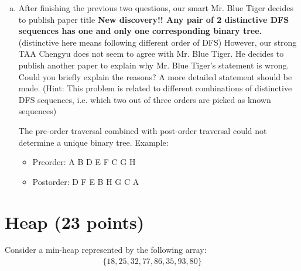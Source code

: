 \documentclass[11pt]{exam}
\begin{document}
\begin{enumerate}[a)]
\begin{solution}
    \par 
    \begin{center}
    \end{center}
\end{solution}

\item After finishing the previous two questions, our smart Mr. Blue Tiger decides to publish paper title \textbf {New discovery!! Any pair of 2 distinctive DFS sequences has one and only one corresponding binary tree.} (distinctive here means following different order of DFS)
However, our strong TAA Chengyu does not seem to agree with Mr. Blue Tiger. He decides to publish another paper to explain why Mr. Blue Tiger's statement is wrong. Could you briefly explain the reasons? A more detailed statement should be made. (Hint: This problem is related to different combinations of distinctive DFS sequences, i.e. which two out of three orders are picked as known sequences)

\begin{solution}
The pre-order traversal combined 
with post-order traversal could 
not determine a unique binary
tree. Example: 
\begin{itemize}
    \item Preorder: A B D E F C G H
    \item Postorder: D F E B H G C A
\end{itemize}
\end{solution}

\end{enumerate}

\section{Heap (23 points)}
Consider a min-heap represented by the following array:
\begin{align*}
\{18,25,32,77,86,35,93,80\}
\end{align*}
\end{document}
